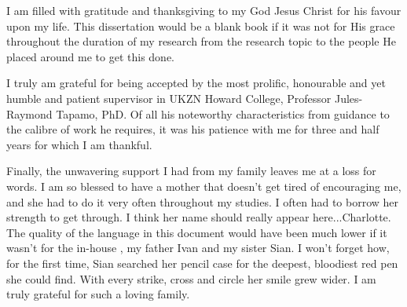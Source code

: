 \documentclass[
11pt, %
english, %
onehalfspacing, %
liststotoc, %
headsepline, %
]{MastersDoctoralThesis} %
\begin{document}
\begin{acknowledgements}
\addchaptertocentry{\acknowledgementname} %

I am filled with gratitude and thanksgiving to my God Jesus Christ for his favour upon my life. This dissertation would be a blank book if it was not for His grace throughout the duration of my research from the research topic to the people He placed around me to get this done.
 
I truly am grateful for being accepted by the most prolific, honourable and yet humble and patient supervisor in UKZN Howard College, Professor Jules-Raymond Tapamo, PhD. Of all his noteworthy characteristics from guidance to the calibre of work he requires, it was his patience with me for three and half years for which I am thankful.

Finally, the unwavering support I had from my family leaves me at a loss for words. I am so blessed to have a mother that doesn't get tired of encouraging me, and she had to do it very often throughout my studies. I often had to borrow her strength to get through. I think her name should really appear here...Charlotte. The quality of the language in this document would have been much lower if it wasn't for the in-house \textsf{}, my father Ivan and my sister Sian. I won't forget how, for the first time, Sian searched her pencil case for the deepest, bloodiest red pen she could find. With every strike, cross and circle her smile grew wider. I am truly grateful for such a loving family.

\end{acknowledgements}


\tableofcontents %

\listoffigures %

\listoftables %

\listofalgorithms %

\end{document}
